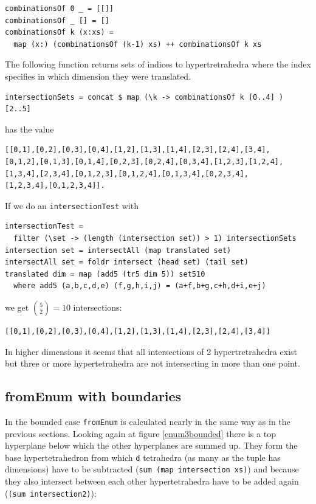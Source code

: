 \documentclass{tmr}
\begin{document}
\begin{Verbatim}
combinationsOf 0 _ = [[]]
combinationsOf _ [] = []
combinationsOf k (x:xs) =
  map (x:) (combinationsOf (k-1) xs) ++ combinationsOf k xs
\end{Verbatim}

The following function returns sets of indices to hypertretrahedra where the index specifies in which dimension they were translated.

\begin{Verbatim}
intersectionSets = concat $ map (\k -> combinationsOf k [0..4] ) [2..5]
\end{Verbatim}

has the value

\begin{Verbatim}
[[0,1],[0,2],[0,3],[0,4],[1,2],[1,3],[1,4],[2,3],[2,4],[3,4],
[0,1,2],[0,1,3],[0,1,4],[0,2,3],[0,2,4],[0,3,4],[1,2,3],[1,2,4],
[1,3,4],[2,3,4],[0,1,2,3],[0,1,2,4],[0,1,3,4],[0,2,3,4],
[1,2,3,4],[0,1,2,3,4]].
\end{Verbatim}

If we do an \verb|intersectionTest| with
\begin{Verbatim}
intersectionTest =
  filter (\set -> (length (intersection set)) > 1) intersectionSets
intersection set = intersectAll (map translated set)
intersectAll set = foldr intersect (head set) (tail set)
translated dim = map (add5 (tr5 dim 5)) set510
  where add5 (a,b,c,d,e) (f,g,h,i,j) = (a+f,b+g,c+h,d+i,e+j)
\end{Verbatim}
we get $\binom{5}{2} = 10$ intersections:

\begin{Verbatim}
[[0,1],[0,2],[0,3],[0,4],[1,2],[1,3],[1,4],[2,3],[2,4],[3,4]]
\end{Verbatim}

In higher dimensions it seems that all intersections of 2 hypertretrahedra exist but three or more hypertetrahedra are not intersecting in more than one point.

\subsection{fromEnum with boundaries}
In the bounded case \verb|fromEnum| is calculated nearly in the same way as in the previous sections. Looking again at figure \ref{enum3bounded} there is a top hyperplane below which the other hyperplanes are summed up. They form the base hypertetrahedron from which \verb|d| tetrahedra (as many as the tuple has dimensions) have to be subtracted (\verb|sum (map intersection xs)|) and because they also intersect between each other hypertetrahedra have to be added again (\verb|(sum intersection2)|):
\end{document}
